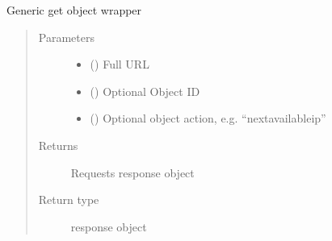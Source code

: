 \documentclass[letterpaper,10pt,english]{sphinxmanual}
\begin{document}
\begin{fulllineitems}
\begin{fulllineitems}
\end{fulllineitems}


\begin{fulllineitems}
\label{\detokenize{bloxone-class:bloxone.b1.get}}
\sphinxAtStartPar
Generic get object wrapper
\begin{quote}\begin{description}
\item[{Parameters}] \leavevmode\begin{itemize}
\item {} 
\sphinxAtStartPar
{} () \textendash{} Full URL

\item {} 
\sphinxAtStartPar
{} () \textendash{} Optional Object ID

\item {} 
\sphinxAtStartPar
{} () \textendash{} Optional object action, e.g. “nextavailableip”

\end{itemize}

\item[{Returns}] \leavevmode
\sphinxAtStartPar
Requests response object

\item[{Return type}] \leavevmode
\sphinxAtStartPar
response object

\end{description}\end{quote}

\end{fulllineitems}



\end{fulllineitems}
\end{document}
